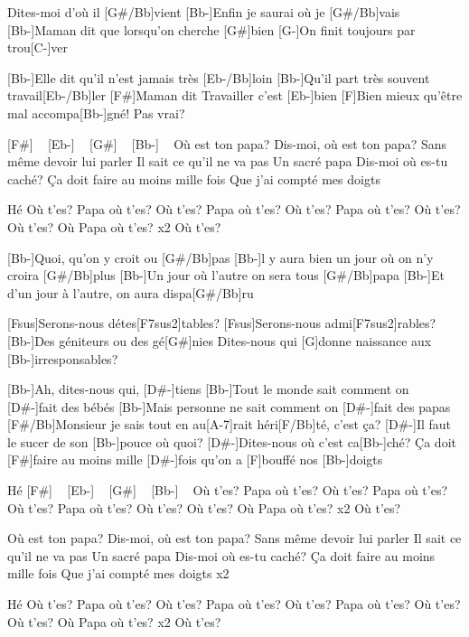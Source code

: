 
\begin{guitar}
[Bb-]Dites-moi d'où il [G#/Bb]vient
[Bb-]Enfin je saurai où je [G#/Bb]vais
[Bb-]Maman dit que lorsqu'on cherche [G#]bien
[G-]On finit toujours par trou[C-]ver

[Bb-]Elle dit qu'il n'est jamais très [Eb-/Bb]loin
[Bb-]Qu'il part très souvent travail[Eb-/Bb]ler
[F#]Maman dit Travailler c'est [Eb-]bien
[F]Bien mieux qu'être mal accompa[Bb-]gné!
Pas vrai?

[F#] ~ [Eb-] ~ [G#] ~ [Bb-] ~
Où est ton papa?
Dis-moi, où est ton papa?
Sans même devoir lui parler
Il sait ce qu'il ne va pas
Un sacré papa
Dis-moi où es-tu caché?
Ça doit faire au moins mille fois
Que j'ai compté mes doigts

Hé
Où t'es? Papa où t'es?
Où t'es? Papa où t'es?
Où t'es? Papa où t'es?
Où t'es? Où t'es? Où Papa où t'es? x2
Où t'es?

[Bb-]Quoi, qu'on y croit ou [G#/Bb]pas
[Bb-]l y aura bien un jour où on n'y croira [G#/Bb]plus
[Bb-]Un jour où l'autre on sera tous [G#/Bb]papa
[Bb-]Et d'un jour à l'autre, on aura dispa[G#/Bb]ru

[Fsus]Serons-nous détes[F7sus2]tables?
[Fsus]Serons-nous admi[F7sus2]rables?
[Bb-]Des géniteurs ou des gé[G#]nies
Dites-nous qui [G]donne naissance aux [Bb-]irresponsables?

[Bb-]Ah, dites-nous qui, [D#-]tiens
[Bb-]Tout le monde sait comment on [D#-]fait des bébés
[Bb-]Mais personne ne sait comment on [D#-]fait des papas
[F#/Bb]Monsieur je sais tout en au[A-7]rait héri[F/Bb]té, c'est ça?
[D#-]Il faut le sucer de son [Bb-]pouce où quoi?
[D#-]Dites-nous où c'est ca[Bb-]ché?
Ça doit [F#]faire au moins mille [D#-]fois qu'on a 
[F]bouffé nos [Bb-]doigts

Hé
[F#] ~ [Eb-] ~ [G#] ~ [Bb-] ~
Où t'es? Papa où t'es?
Où t'es? Papa où t'es?
Où t'es? Papa où t'es?
Où t'es? Où t'es? Où Papa où t'es? x2
Où t'es?

Où est ton papa?
Dis-moi, où est ton papa?
Sans même devoir lui parler
Il sait ce qu'il ne va pas
Un sacré papa
Dis-moi où es-tu caché?
Ça doit faire au moins mille fois
Que j'ai compté mes doigts x2


Hé
Où t'es? Papa où t'es?
Où t'es? Papa où t'es?
Où t'es? Papa où t'es?
Où t'es? Où t'es? Où Papa où t'es? x2
Où t'es?
\end{guitar}